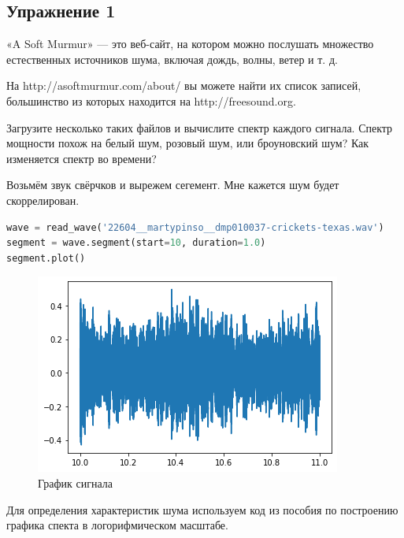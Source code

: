 \subsection{Упражнение 1}

«A Soft Murmur» — это веб-сайт, на котором можно послушать множество естественных источников шума, включая дождь, волны, ветер и т. д. 

\noindent На http://asoftmurmur.com/about/ вы можете найти их список записей, большинство из которых находится на http://freesound.org.

\noindent Загрузите несколько таких файлов и вычислите спектр каждого сигнала. Спектр мощности похож на белый шум, розовый шум, или броуновский шум? Как изменяется спектр во времени?

Возьмём звук свёрчков и вырежем сегемент. Мне кажется шум будет скоррелирован.

\begin{lstlisting}[language=Python]
wave = read_wave('22604__martypinso__dmp010037-crickets-texas.wav')
segment = wave.segment(start=10, duration=1.0)
segment.plot()
\end{lstlisting}
\begin{figure}[H]
	\begin{center}
		\includegraphics[scale=1]{fig/lab04/lab04_7_0.png}
		\caption{График сигнала}
	\end{center}
\end{figure}

Для определения характеристик шума используем код из пособия по построению графика спекта в логорифмическом масштабе.


